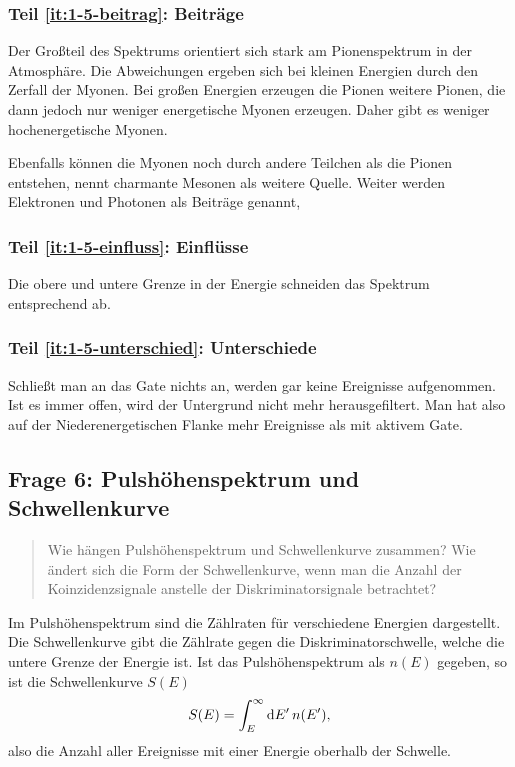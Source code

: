 \documentclass[11pt, ngerman, fleqn, DIV=15, headinclude, BCOR=2cm]{scrreprt}
\begin{document}
\subsubsection{Teil \ref{it:1-5-beitrag}: Beiträge}

Der Großteil des Spektrums orientiert sich stark am Pionenspektrum in der
Atmosphäre. Die Abweichungen ergeben sich bei kleinen Energien durch den
Zerfall der Myonen. Bei großen Energien erzeugen die Pionen weitere Pionen, die
dann jedoch nur weniger energetische Myonen erzeugen. Daher gibt es weniger
hochenergetische Myonen. \parencite[§7.2]{Grupen/Astroteilchenphysik}

Ebenfalls können die Myonen noch durch andere Teilchen als die Pionen
entstehen, \parencite[115]{Grupen/Astroteilchenphysik} nennt charmante Mesonen
als weitere Quelle. Weiter werden Elektronen und Photonen als Beiträge genannt,

\subsubsection{Teil \ref{it:1-5-einfluss}: Einflüsse}

Die obere und untere Grenze in der Energie schneiden das Spektrum entsprechend
ab.


\subsubsection{Teil \ref{it:1-5-unterschied}: Unterschiede}

Schließt man an das Gate nichts an, werden gar keine Ereignisse aufgenommen.
Ist es immer offen, wird der Untergrund nicht mehr herausgefiltert. Man hat
also auf der Niederenergetischen Flanke mehr Ereignisse als mit aktivem Gate.

\subsection{Frage 6: Pulshöhenspektrum und Schwellenkurve}

\begin{quote}
    Wie hängen Pulshöhenspektrum und Schwellenkurve zusammen? Wie ändert sich
    die Form der Schwellenkurve, wenn man die Anzahl der Koinzidenzsignale
    anstelle der Diskriminatorsignale betrachtet?
\end{quote}

Im Pulshöhenspektrum sind die Zählraten für verschiedene Energien dargestellt.
Die Schwellenkurve gibt die Zählrate gegen die Diskriminatorschwelle, welche
die untere Grenze der Energie ist. Ist das Pulshöhenspektrum als $n(E)$
gegeben, so ist die Schwellenkurve $S(E)$
\[
    S(E) = \int_E^\infty \dif E' \, n(E'),
\]
also die Anzahl aller Ereignisse mit einer Energie oberhalb der Schwelle.
\end{document}
